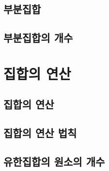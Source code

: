 \documentclass[t,8pt]{beamer}
\begin{document}
\subsection{부분집합}
\begin{frame}[t]{\subsecname}
\end{frame}

\subsection{부분집합의 개수}
\begin{frame}[t]{\subsecname}
\end{frame}

\section{집합의 연산}

\subsection{집합의 연산}
\begin{frame}[t]{\subsecname}
\end{frame}

\subsection{집합의 연산 법칙}
\begin{frame}[t]{\subsecname}
\end{frame}

\subsection{유한집합의 원소의 개수}
\begin{frame}[t]{\subsecname}
\end{frame}
\end{document}
